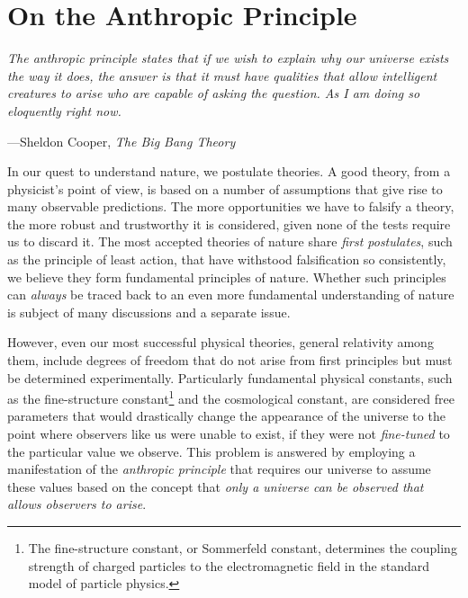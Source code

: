 \chapter{On the Anthropic Principle}\label{app:anthropic}

\epigraph{\itshape The anthropic principle states that if we wish to explain why our universe exists the way it does, the answer is that it must have qualities that allow intelligent creatures to arise who are capable of asking the question. As I am doing so eloquently right now.}{---Sheldon Cooper, \textit{The Big Bang Theory}\footnotemark}

In our quest to understand nature, we postulate theories. A good theory, from a physicist's point of view, is based on a number of assumptions that give rise to many observable predictions. The more opportunities we have to falsify a theory, the more robust and trustworthy it is considered, given none of the tests require us to discard it. The most accepted theories of nature share \emph{first postulates}, such as the principle of least action, that have withstood falsification so consistently, we believe they form fundamental principles of nature. Whether such principles can \emph{always} be traced back to an even more fundamental understanding of nature is subject of many discussions and a separate issue.

However, even our most successful physical theories, general relativity among them, include degrees of freedom that do not arise from first principles but must be determined experimentally. Particularly fundamental physical constants, such as the fine-structure constant\footnote{The fine-structure constant, or Sommerfeld constant, determines the coupling strength of charged particles to the electromagnetic field in the standard model of particle physics.} and the cosmological constant, are considered free parameters that would drastically change the appearance of the universe to the point where observers like us were unable to exist, if they were not \emph{fine-tuned} to the particular value we observe. This problem is answered by employing a manifestation of the \emph{anthropic principle} that requires our universe to assume these values based on the concept that \emph{only a universe can be observed that allows observers to arise}.

